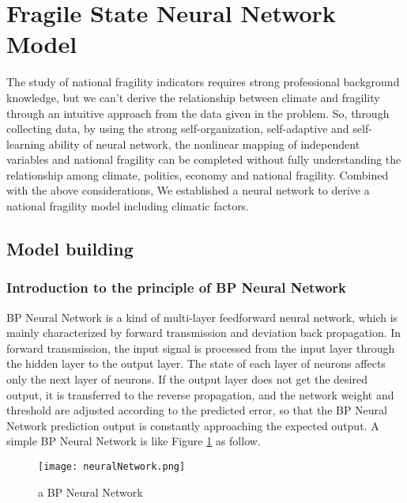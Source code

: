 \documentclass{mcmthesis}
\newcommand{\upcite}[1]{\textsuperscript{\textsuperscript{\cite{#1}}}}
\begin{document}





\section{Fragile State Neural Network Model}
The study of national fragility indicators requires strong professional
background knowledge, but we can't derive the relationship between climate
and fragility through an intuitive approach from the data given in the 
problem. So, through collecting data, by using the strong self-organization, 
self-adaptive and self-learning ability of neural network, the nonlinear 
mapping of independent variables and national fragility can be completed 
without fully understanding the relationship among climate, politics, 
economy and national fragility. Combined with the above considerations, 
We established a neural network to derive a national fragility model 
including climatic factors.
\subsection{Model building}
\subsubsection{Introduction to the principle of BP Neural Network}
BP Neural Network is a kind of multi-layer feedforward neural network, 
which is mainly characterized by forward transmission and deviation back 
propagation. In forward transmission, the input signal is processed from 
the input layer through the hidden layer to the output layer. The state of 
each layer of neurons affects only the next layer of neurons. If the output 
layer does not get the desired output, it is transferred to the reverse 
propagation, and the network weight and threshold are adjusted according 
to the predicted error, so that the BP Neural Network prediction output 
is constantly approaching the expected output. A simple BP Neural Network 
is like Figure \ref{fig:nn} as follow.\upcite{bib20}
\begin{figure}[h]
\small
\centering
\texttt{[image: neuralNetwork.png]}
\caption{a BP Neural Network} 
\label{fig:nn}
\end{figure}
\end{document}
